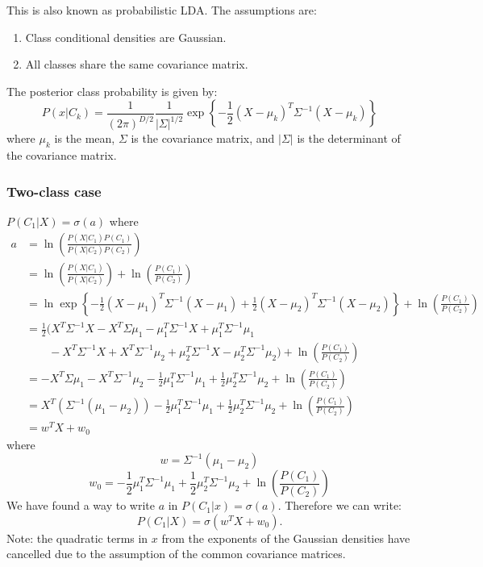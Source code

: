 \documentclass[a4paper,12pt]{article}
\begin{document}
This is also known as probabilistic LDA. The assumptions are: 
\begin{enumerate}
\item
Class conditional densities are Gaussian. 
\item
All classes share the same covariance matrix. 
\end{enumerate}
The posterior class probability is given by: 
$$P(x|C_k) = \frac{1}{(2\pi)^{D/2}} \frac{1}{|\Sigma|^{1/2}} \exp \left\{-\frac{1}{2} (X-\mu_k)^T \Sigma^{-1}(X-\mu_k)\right\}$$
where $\mu_k$ is the mean, $\Sigma$ is the covariance matrix, and $|\Sigma|$ is the determinant of the covariance matrix. 

\subsubsection{Two-class case}

$P(C_1|X) = \sigma(a)$ where
\begin{align*}
a &= \ln\left(\frac{P(X|C_1)P(C_1)}{P(X|C_2)P(C_2)}\right)\\
  &= \ln\left(\frac{P(X|C_1)}{P(X|C_2)}\right) + \ln\left(\frac{P(C_1)}{P(C_2)}\right) \\
  &= \ln \exp \left\{-\frac{1}{2} (X-\mu_1)^T \Sigma^{-1}(X-\mu_1) +\frac{1}{2} (X-\mu_2)^T \Sigma^{-1}(X-\mu_2) \right\} + \ln\left(\frac{P(C_1)}{P(C_2)}\right) \\
  &= \frac{1}{2} (X^T\Sigma^{-1}X - X^T\Sigma\mu_1 - \mu_1^T\Sigma^{-1}X + \mu_1^T\Sigma^{-1}\mu_1 \\
     &\qquad- X^T\Sigma^{-1}X + X^T\Sigma^{-1}\mu_2 + \mu_2^T \Sigma^{-1}X - \mu_2^T\Sigma^{-1}\mu_2) + \ln\left(\frac{P(C_1)}{P(C_2)}\right)\\
     &= - X^T\Sigma\mu_1 - X^T\Sigma^{-1}\mu_2 - \frac{1}{2}\mu_1^T\Sigma^{-1}\mu_1 + \frac{1}{2}\mu_2^T\Sigma^{-1}\mu_2 + \ln\left(\frac{P(C_1)}{P(C_2)}\right) \\
     &= X^T(\Sigma^{-1}(\mu_1-\mu_2)) - \frac{1}{2}\mu_1^T\Sigma^{-1}\mu_1 + \frac{1}{2}\mu_2^T\Sigma^{-1}\mu_2 + \ln\left(\frac{P(C_1)}{P(C_2)}\right) \\
	 &= w^TX + w_0
\end{align*}
where
$$w = \Sigma^{-1}(\mu_1 - \mu_2)$$
$$w_0 = - \frac{1}{2}\mu_1^T\Sigma^{-1}\mu_1 + \frac{1}{2}\mu_2^T\Sigma^{-1}\mu_2 + \ln\left(\frac{P(C_1)}{P(C_2)}\right)$$
We have found a way to write $a$ in $P(C_1|x) = \sigma(a)$. Therefore we can write: 
$$P(C_1|X) = \sigma(w^TX + w_0).$$
Note: the quadratic terms in $x$ from the exponents of the Gaussian densities have cancelled due to the assumption of the common covariance matrices. 
\end{document}
